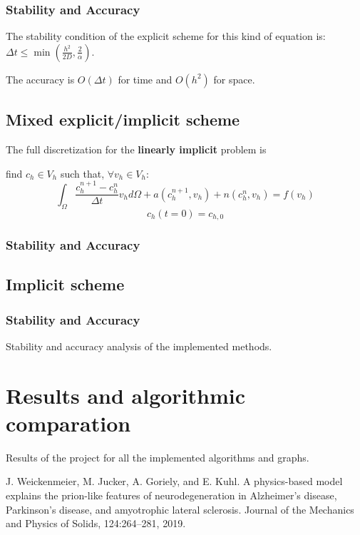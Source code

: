 \documentclass[12pt, letterpaper]{article}
\begin{document}
\subsubsection{Stability and Accuracy}
The stability condition of the explicit scheme for this kind of equation is: $\Delta t\leq\min(\frac{h^2}{2D}, \frac2\alpha)$.

\noindent The accuracy is $O(\Delta t)$ for time and $O(h^2)$ for space.

\subsection{Mixed explicit/implicit scheme}
The full discretization for the \textbf{linearly implicit} problem is

\vspace{1em}
\noindent
find $c_h\in V_h$ such that, $\forall v_h\in V_h$:
$$\int_\Omega\frac{c_h^{n+1}-c_h^n}{\Delta t}v_hd\Omega+a(c_h^{n+1},v_h)+n(c_h^n,v_h)=f(v_h)$$
$$c_h(t=0)=c_{h,0}$$

\subsubsection{Stability and Accuracy}

\subsection{Implicit scheme}
\subsubsection{Stability and Accuracy}

Stability and accuracy analysis of the implemented methods.

\section{Results and algorithmic comparation}
Results of the project for all the implemented algorithms and graphs.

\begin{thebibliography}{9}
    J. Weickenmeier, M. Jucker, A. Goriely, and E. Kuhl. A physics-based model explains the prion-like features of neurodegeneration in Alzheimer’s disease, Parkinson’s disease, and amyotrophic lateral sclerosis. Journal of the Mechanics and
    Physics of Solids, 124:264–281, 2019.
\end{thebibliography}
\end{document}
